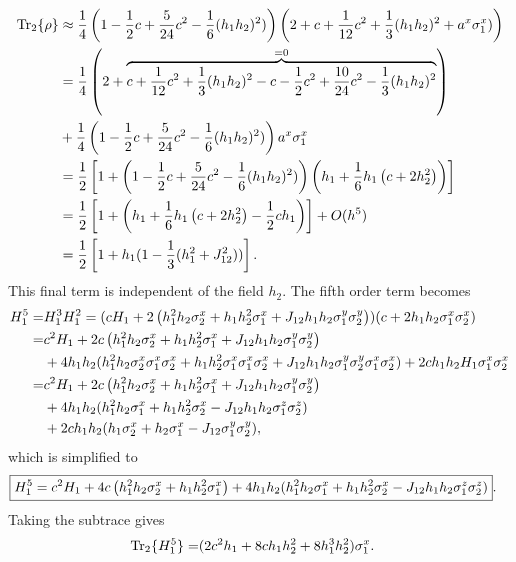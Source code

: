 \begin{align*}
    \Tr_2\{\rho\}  & \approx  \frac{1}{4}\left(1 - \frac{1}{2}c+\frac{5}{24}c^2 - \frac{1}{6} (h_1h_2)^2) \right)\left(2+c + \frac{1}{12} c^2 + \frac{1}{3}(h_1 h_2)^2 + a^x {\sigma^{x}_1})\right)\\
    & = \frac{1}{4}\left(2+\overbrace{c + \frac{1}{12} c^2 + \frac{1}{3}(h_1 h_2)^2 - c - \frac{1}{2}c^2 + \frac{10}{24}c^2 - \frac{1}{3}(h_1 h_2)^2}^{=0}\right) \\
    & + \frac{1}{4}\left(1 - \frac{1}{2}c+\frac{5}{24}c^2 - \frac{1}{6} (h_1h_2)^2) \right)a^x{\sigma^{x}_1}\\
    & = \frac{1}{2} \left[1 + \left(1 - \frac{1}{2}c+\frac{5}{24}c^2 - \frac{1}{6} (h_1h_2)^2) \right)\left(h_1 + \frac{1}{6} h_1 \left(c  + 2 h_2^2 \right)\right)\right]\\
    & =  \frac{1}{2} \left[1 + \left(h_1 + \frac{1}{6} h_1 \left(c  + 2 h_2^2 \right) -\frac{1}{2}c h_1 \right) \right] + O(h^5)\\
    & =  \frac{1}{2} \left[1 + h_1(1 - \frac{1}{3}(h_1^2+ J^2_{12})) \right].
\end{align*}
This final term is independent of the field $h_2$. The fifth order term becomes
\begin{align*}
    H_1^5 =& H_1^3 H_1^2 = (c {H_1} + 2 \left(h_1^2 h_2 {\sigma^{x}_2} +  h_1h_2^2 {\sigma^{x}_1} + J_{12} h_1 h_2 {\sigma^{y}_1} {\sigma^{y}_2}\right))(c + 2 h_1 h_2 {\sigma^{x}_1} {\sigma^{x}_2})\\
    = & c^2 {H_1} + 2c \left(h_1^2 h_2 {\sigma^{x}_2} +  h_1 h_2^2 {\sigma^{x}_1} + J_{12} h_1 h_2 {\sigma^{y}_1} {\sigma^{y}_2}\right) \\
    & +  4 h_1 h_2(h_1^2 h_2  {\sigma^{x}_2} {\sigma^{x}_1}{\sigma^{x}_2} + h_1 h_2^2  {\sigma^{x}_1} {\sigma^{x}_1}{\sigma^{x}_2} + J_{12}h_1 h_2\sigma^{y}_1\sigma^{y}_2{\sigma^{x}_1}{\sigma^{x}_2})
    + 2c h_1 h_2 {H_1}{\sigma^{x}_1} {\sigma^{x}_2} \\
    = &  c^2 {H_1} + 2c \left(h_1^2 h_2 {\sigma^{x}_2} +  h_1h_2^2 {\sigma^{x}_1} + J_{12} h_1 h_2 {\sigma^{y}_1} {\sigma^{y}_2}\right) \\
    & +  4 h_1 h_2(h_1^2 h_2 {\sigma^{x}_1} + h_1 h_2^2 {\sigma^{x}_2} - J_{12}h_1 h_2{\sigma^{z}_1}{\sigma^{z}_2})\\
    & + 2c h_1 h_2 (h_1 {\sigma^{x}_2} + h_2 {\sigma^{x}_1} - J_{12} {\sigma^{y}_1}{\sigma^{y}_2}),
\end{align*}
which is simplified to 
\begin{align*}
    \Aboxed{H_1^5 = & c^2 {H_1} + 4c \left(h_1^2 h_2 {\sx_2} +  h_1h_2^2 {\sx_1}\right) + 4 h_1 h_2(h_1^2 h_2 {\sx_1} + h_1 h_2^2 {\sx_2} - J_{12}h_1 h_2{\sz_1}{\sz_2})}.
\end{align*}
Taking the subtrace gives
\begin{align*}
    \Tr_2\{H_1^5\} = &  (2c^2 h_1  + 8c h_1 h_2^2 +  8 h_1^3 h_2^2){\sigma^{x}_1}.
\end{align*}
